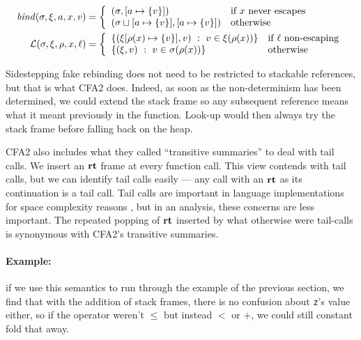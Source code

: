 \documentclass{llncs}
\begin{document}
\begin{align*}
  \mathit{bind}(\sigma,\xi,a,x,v) &=
   \left\{\begin{array}{ll}
            (\sigma, [a \mapsto \{ v \}]) & \text{if } x \text{ never escapes} \\
            (\sigma\sqcup[a \mapsto \{ v \}], [a \mapsto \{ v \}]) & \text{otherwise } \\
          \end{array}\right. \\
  {\mathcal L}(\sigma,\xi,\rho,x,\ell) &=
    \left\{\begin{array}{ll}
          \{ (\xi[\rho(x) \mapsto \{ v \}], v)\ :\ v \in \xi(\rho(x))\}
                   & \text{if } \ell \text{ non-escaping} \\
          \{ (\xi,v)\ :\ v \in \sigma(\rho(x))\} & \text{otherwise}
           \end{array}\right.
\end{align*}

Sidestepping fake rebinding does not need to be restricted to
stackable references, but that is what CFA2 does. Indeed, as soon as
the non-determinism has been determined, we could extend the stack
frame so any subsequent reference means what it meant previously in
the function. Look-up would then always try the stack frame before
falling back on the heap.

CFA2 also includes what they called ``transitive summaries'' to deal
with tail calls. We insert an $\mathbf{rt}$ frame at every function call.
This view contends with tail calls, but we can identify tail calls
easily --- any call with an $\mathbf{rt}$ as its continuation is a tail
call. Tail calls are important in language implementations for space
complexity reasons \citep{ianjohnson:clinger:tail-calls:1998}, but in
an analysis, these concerns are less important. The repeated popping
of $\mathbf{rt}$ inserted by what otherwise were tail-calls is synonymous with
CFA2's transitive summaries.

\paragraph{Example:} if we use this semantics to run through the
example of the previous section, we find that with the addition of
stack frames, there is no confusion about \texttt{z}'s value either,
so if the operator weren't $\le$ but instead $<$ or $+$, we could
still constant fold that away.
\end{document}
